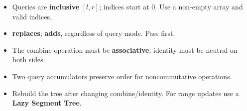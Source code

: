 \documentclass[9pt,a4paper]{extarticle}
\begin{document}
\begin{minipage}[t]{\textwidth}
\begin{minipage}[t]{0.475\linewidth}

\begin{itemize}[
  leftmargin=11pt,
  topsep=0pt,
  itemsep=1pt,
  parsep=0pt
]

\item Queries are \textbf{inclusive} $[l,r]$;
indices start at $0$. Use a non-empty array
and valid indices.

\item {}
\textbf{replaces};
\textbf{adds}, regardless of query mode.
Pass  first.

\item The combine operation must be
\textbf{associative}; identity must be
neutral on both sides.

\item Two query accumulators preserve order
for noncommutative operations.

\item Rebuild the tree after changing
combine/identity.
For range updates use a
\textbf{Lazy Segment Tree}.

\end{itemize}

\end{minipage}%
\end{minipage}

\endgroup



\clearpage
\begingroup
{}
\newcommand{\eghead}[1]{\par\vspace{5pt}\noindent
 {\bfseries\fontsize{11.3}{13.42}\selectfont #1}\par\vspace{1pt}\hrule\vspace{3pt}}
\newcommand{\egbody}[1]{\begingroup\raggedright
 \fontsize{10.7}{13.22}\selectfont #1\par\endgroup}
\newcommand{\egcode}[1]{{\ttfamily\fontsize{9.35}{11.07}\selectfont\detokenize{#1}}}
\end{document}
